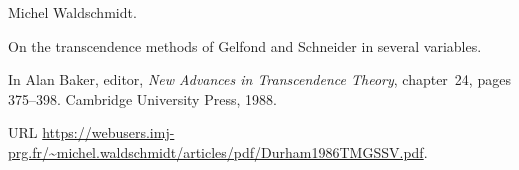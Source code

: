 Michel Waldschmidt.

\newblock On the transcendence methods of {Gelfond} and {Schneider} in several
  variables.

\newblock In Alan Baker, editor, \emph{New Advances in Transcendence Theory},
  chapter~24, pages 375--398. Cambridge University Press, 1988{}.

\newblock URL
  \url{https://webusers.imj-prg.fr/~michel.waldschmidt/articles/pdf/Durham1986TMGSSV.pdf}.